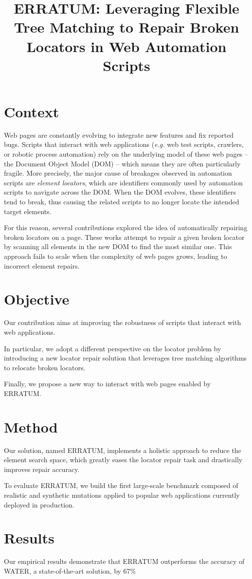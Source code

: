 \documentclass[11pt]{article}
\title{ERRATUM: Leveraging Flexible Tree Matching to Repair Broken Locators in Web Automation Scripts}
\begin{document}
\maketitle

\section{Context}
Web pages are constantly evolving to integrate new features and fix reported bugs.
Scripts that interact with web applications (\emph{e.g.} web test scripts, crawlers, or robotic process automation) rely on the underlying model of these web pages -- the Document Object Model (DOM) -- which means they are often particularly fragile.
More precisely, the major cause of breakages observed in automation scripts are \emph{element locators}, which are identifiers commonly used by automation scripts to navigate across the DOM.
When the DOM evolves, these identifiers tend to break, thus causing the related scripts to no longer locate the intended target elements.

For this reason, several contributions explored the idea of automatically repairing broken locators on a page.
These works attempt to repair a given broken locator by scanning all elements in the new DOM to find the most similar one.
This approach fails to scale when the complexity of web pages grows, leading to incorrect element repairs.
\section{Objective}
Our contribution aims at improving the robustness of scripts that interact with web applications.

In particular, we adopt a different perspective on the locator problem by introducing a new locator repair solution that leverages tree matching algorithms to relocate broken locators.

Finally, we propose a new way to interact with web pages enabled by ERRATUM.

\section{Method}
Our solution, named ERRATUM, implements a holistic approach to reduce the element search space, which greatly eases the locator repair task and drastically improves repair accuracy.

To evaluate ERRATUM, we build the first large-scale benchmark composed of realistic and synthetic mutations applied to popular web applications currently deployed in production.

\section{Results}
Our empirical results demonstrate that ERRATUM outperforms the accuracy of WATER, a state-of-the-art solution, by 67\%
\end{document}
